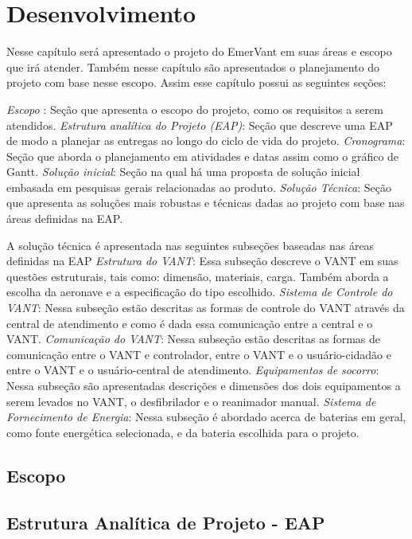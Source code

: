 \chapter{Desenvolvimento}\label{cap2}
 Nesse capítulo será apresentado o projeto do EmerVant em suas áreas e escopo que irá atender. Também nesse capítulo  são apresentados o planejamento do projeto com base nesse escopo. Assim esse capítulo possui as seguintes seções:

\textit{Escopo} : Seção que apresenta o escopo do projeto, como os requisitos a serem atendidos.
\textit{Estrutura analítica do Projeto (EAP)}: Seção que descreve uma  EAP de modo a planejar as entregas ao longo do ciclo de vida do projeto.
\textit{Cronograma}: Seção que aborda o planejamento em atividades e datas assim como o gráfico de Gantt.
\textit{Solução inicial}: Seção na qual há uma proposta de solução inicial embasada em pesquisas gerais relacionadas ao produto.
\textit{Solução Técnica}: Seção que apresenta as soluções mais robustas e técnicas dadas ao projeto com base nas áreas definidas na EAP.

A solução técnica é apresentada nas seguintes subseções baseadas nas áreas definidas na EAP
\textit{Estrutura do VANT}: Essa subseção descreve o VANT em suas questões estruturais, tais como: dimensão, materiais, carga. Também aborda a escolha da aeronave e a especificação do tipo escolhido.
\textit{Sistema de Controle do VANT}: Nessa subseção estão descritas as formas de controle do VANT através da central de atendimento e como é dada essa comunicação entre a central e o VANT.
\textit{Comunicação do VANT}: Nessa subseção estão descritas as formas de comunicação entre o VANT e controlador, entre o VANT e o usuário-cidadão e entre o VANT e o usuário-central de atendimento.
\textit{Equipamentos de socorro}: Nessa subseção são apresentadas descrições e dimensões dos dois equipamentos a serem levados no VANT, o desfibrilador e o reanimador manual.
\textit{Sistema de Fornecimento de Energia}: Nessa subseção é abordado acerca de baterias em geral, como fonte energética selecionada, e da bateria escolhida para o projeto.


 \section{Escopo}
  

\section{Estrutura Analítica de Projeto - EAP}
  
 
